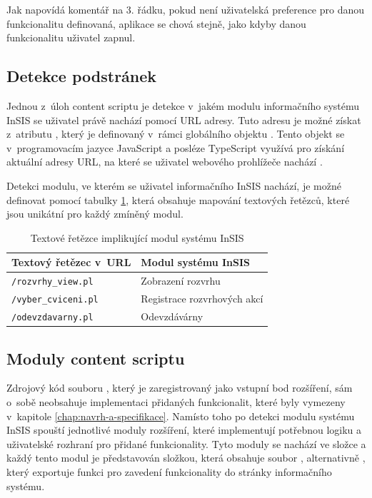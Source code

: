 Jak napovídá komentář na 3. řádku, pokud není uživatelská preference pro danou funkcionalitu definovaná, aplikace se chová stejně, jako kdyby danou funkcionalitu uživatel zapnul.

\subsection{Detekce podstránek}

Jednou z~úloh content scriptu je detekce v~jakém modulu informačního systému InSIS se uživatel právě nachází pomocí URL adresy. Tuto adresu je možné získat z~atributu , který je definovaný v~rámci globálního objektu . Tento objekt se v~programovacím jazyce JavaScript a posléze TypeScript využívá pro získání aktuální adresy URL, na které se uživatel webového prohlížeče nachází \cite[kap. 15.10]{flanagan_javascript_2020}.

Detekci modulu, ve kterém se uživatel informačního InSIS nachází, je možné definovat pomocí tabulky \ref{tab:url-patterny}, která obsahuje mapování textových řetězců, které jsou unikátní pro každý zmíněný modul.

\begin{table}[htbp!]
\centering
\caption{Textové řetězce implikující modul systému InSIS}\label{tab:url-patterny}
    \begin{tabular}{ll}
        \toprule
        \textbf{Textový řetězec v~URL} & \textbf{Modul systému InSIS} \\
        \midrule
        \verb|/rozvrhy_view.pl| & Zobrazení rozvrhu \\
        \verb|/vyber_cviceni.pl| & Registrace rozvrhových akcí \\
        \verb|/odevzdavarny.pl| & Odevzdávárny \\
        \bottomrule
    \end{tabular}
\end{table}

\subsection{Moduly content scriptu}

Zdrojový kód souboru , který je zaregistrovaný jako vstupní bod rozšíření, sám o~sobě neobsahuje implementaci přidaných funkcionalit, které byly vymezeny v~kapitole \ref{chap:navrh-a-specifikace}. Namísto toho po detekci modulu systému InSIS spouští jednotlivé moduly rozšíření, které implementují potřebnou logiku a uživatelské rozhraní pro přidané funkcionality. Tyto moduly se nachází ve složce  a každý tento modul je představován složkou, která obsahuje soubor , alternativně , který exportuje funkci pro zavedení funkcionality do stránky informačního systému. 


